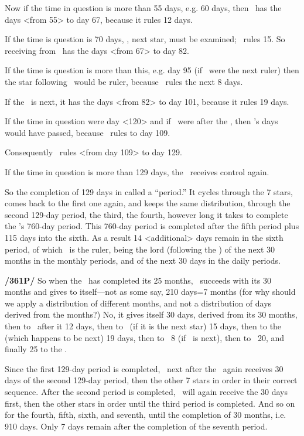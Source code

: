 Now if the time in question is more than 55 days, e.g. 60 days, then \Jupiter\, has the days <from 55> to day 67, because it rules 12 days. 

If the time is question is 70 days, \Mars, next star, must be examined; \Mars\, rules 15. So \Mars\, receiving from \Jupiter\, has the days <from 67> to day 82. 

If the time is question is more than this, e.g. day 95 (if \Venus\, were the next ruler) then the star following \Venus\, would be ruler, because \Venus\, rules the next 8 days. 

If the \Sun\, is next, it has the days <from 82> to day 101, because it rules 19 days. 

If the time in question were day <120> and if \Venus\, were after the \Sun, then \Venus’s days would have passed, because \Venus\, rules to day 109.

Consequently \Mercury\, rules <from day 109> to day 129. 

If the time in question is more than 129 days, the \Moon\, receives control again.

So the completion of 129 days in called a “period.” It cycles through the 7 stars, comes back to the first one again, and keeps the same distribution, through the second 129-day period, the third, the fourth,
however long it takes to complete the \Moon’s 760-day period. This 760-day period is completed after the fifth period plus 115 days into the sixth. As a result 14 <additional> days remain in the sixth period, of which \Saturn\, is the ruler, being the lord (following the \Moon) of the next 30 months in the monthly periods, and of the next 30 days in the daily periods. 

\textbf{/361P/} So when the \Moon\, has completed its 25 months, \Saturn\, succeeds with its 30 months and gives to itself—not as some say, 210 days=7 months (for why should we apply a distribution of different months, and not a distribution of days derived from the
months?) No, it gives itself 30 days, derived from its 30 months, then to \Jupiter\, after it 12 days, then to \Mars\, (if it is the next star) 15 days, then to the \Sun\, (which happens to be next) 19 days, then to \Venus\, 8 (if \Venus\, is next), then to \Mercury\, 20, and finally 25 to the \Moon.

Since the first 129-day period is completed, \Saturn\, next after the \Moon\, again receives 30 days of the second 129-day period, then the other 7 stars in order in their correct sequence. After the second period is completed, \Saturn\, will again receive the 30 days first, then the other stars in order until the third period is completed. And so on for the fourth, fifth, sixth, and seventh, until the completion of 30 months, i.e. 910 days. Only 7 days remain after the completion of the seventh period.

